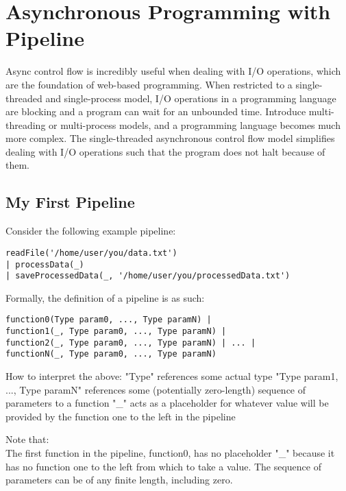 \documentclass[./LRM_main.tex]{subfiles}
\begin{document}


\chapter{Asynchronous Programming with Pipeline}
Async control flow is incredibly useful when dealing with I/O operations, which are the foundation of web-based programming. When restricted to a single-threaded and single-process model, I/O operations in a programming language are blocking and a program can wait for an unbounded time. Introduce multi-threading or multi-process models, and a programming language becomes much more complex. The single-threaded asynchronous control flow model simplifies dealing with I/O operations such that the program does not halt because of them.


\section{My First Pipeline}
Consider the following example pipeline:

\begin{lstlisting}
readFile('/home/user/you/data.txt') 
| processData(_) 
| saveProcessedData(_, '/home/user/you/processedData.txt')
\end{lstlisting}
Formally, the definition of a pipeline is as such:
\begin{lstlisting}
function0(Type param0, ..., Type paramN) | 
function1(_, Type param0, ..., Type paramN) | 
function2(_, Type param0, ..., Type paramN) | ... | 
functionN(_, Type param0, ..., Type paramN)
\end{lstlisting}
How to interpret the above:
"Type" references some actual type
"Type param1, ..., Type paramN" references some (potentially zero-length) sequence of parameters to a function "\_" acts as a placeholder for whatever value will be provided by the function one to the left in the pipeline

\begin{adjustwidth}{1cm}{2cm}
Note that:\\
The first function in the pipeline, function0, has no placeholder "\_" because it has no function one to the left from which to take a value.
The sequence of parameters can be of any finite length, including zero.
\end{adjustwidth}
\end{document}
